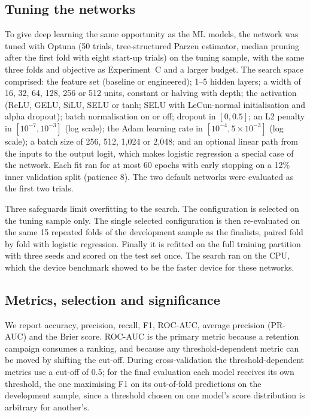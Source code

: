 \documentclass[conference]{IEEEtran}
\begin{document}
\subsection{Tuning the networks}\label{sec:nettune}
To give deep learning the same opportunity as the ML models, the network was tuned with Optuna (50 trials, tree-structured Parzen estimator, median pruning after the first fold with eight start-up trials) on the tuning sample, with the same three folds and objective as Experiment~C and a larger budget. The search space comprised: the feature set (baseline or engineered); 1--5 hidden layers; a width of 16, 32, 64, 128, 256 or 512 units, constant or halving with depth; the activation (ReLU, GELU, SiLU, SELU or tanh; SELU with LeCun-normal initialisation and alpha dropout); batch normalisation on or off; dropout in $[0,0.5]$; an L2 penalty in $[10^{-7},10^{-3}]$ (log scale); the Adam learning rate in $[10^{-4},5\times10^{-3}]$ (log scale); a batch size of 256, 512, 1,024 or 2,048; and an optional linear path from the inputs to the output logit, which makes logistic regression a special case of the network. Each fit ran for at most 60 epochs with early stopping on a 12\% inner validation split (patience 8). The two default networks were evaluated as the first two trials.

Three safeguards limit overfitting to the search. The configuration is selected on the tuning sample only. The single selected configuration is then re-evaluated on the same 15 repeated folds of the development sample as the finalists, paired fold by fold with logistic regression. Finally it is refitted on the full training partition with three seeds and scored on the test set once. The search ran on the CPU, which the device benchmark showed to be the faster device for these networks.

\subsection{Metrics, selection and significance}
We report accuracy, precision, recall, F1, ROC-AUC, average precision (PR-AUC) and the Brier score. ROC-AUC is the primary metric because a retention campaign consumes a ranking, and because any threshold-dependent metric can be moved by shifting the cut-off. During cross-validation the threshold-dependent metrics use a cut-off of 0.5; for the final evaluation each model receives its own threshold, the one maximising F1 on its out-of-fold predictions on the development sample, since a threshold chosen on one model's score distribution is arbitrary for another's.
\end{document}
